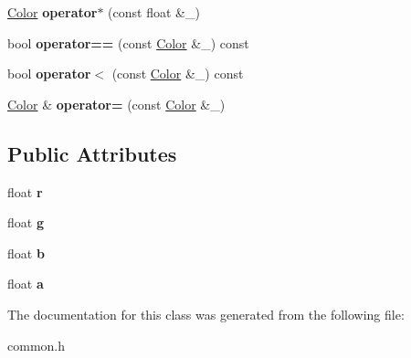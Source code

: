 \begin{DoxyCompactItemize}
\item 
\hypertarget{class_color_ab2314b33eff67bb6342f2e4feb83e125}{}\hyperlink{class_color}{Color} {\bfseries operator$\ast$} (const float \&\+\_\+)\label{class_color_ab2314b33eff67bb6342f2e4feb83e125}

\item 
\hypertarget{class_color_aa29f3359129d21b368e1dcd26a2a0071}{}bool {\bfseries operator==} (const \hyperlink{class_color}{Color} \&\+\_\+) const \label{class_color_aa29f3359129d21b368e1dcd26a2a0071}

\item 
\hypertarget{class_color_a217a675763bfe3521af284df9e77fee4}{}bool {\bfseries operator$<$} (const \hyperlink{class_color}{Color} \&\+\_\+) const \label{class_color_a217a675763bfe3521af284df9e77fee4}

\item 
\hypertarget{class_color_a709d0f867716d9e9a645f4ea63a65a2a}{}\hyperlink{class_color}{Color} \& {\bfseries operator=} (const \hyperlink{class_color}{Color} \&\+\_\+)\label{class_color_a709d0f867716d9e9a645f4ea63a65a2a}

\end{DoxyCompactItemize}
\subsection*{Public Attributes}
\begin{DoxyCompactItemize}
\item 
\hypertarget{class_color_a3958a556b47d2de3dd45c75aac833c20}{}float {\bfseries r}\label{class_color_a3958a556b47d2de3dd45c75aac833c20}

\item 
\hypertarget{class_color_a5defbb21620e480e556181772d665f34}{}float {\bfseries g}\label{class_color_a5defbb21620e480e556181772d665f34}

\item 
\hypertarget{class_color_a33e482be18d6ea31d2b403bee13683b7}{}float {\bfseries b}\label{class_color_a33e482be18d6ea31d2b403bee13683b7}

\item 
\hypertarget{class_color_a98047aee65fc3d825f88a76da728fd27}{}float {\bfseries a}\label{class_color_a98047aee65fc3d825f88a76da728fd27}

\end{DoxyCompactItemize}


The documentation for this class was generated from the following file\+:\begin{DoxyCompactItemize}
\item 
common.\+h\end{DoxyCompactItemize}

